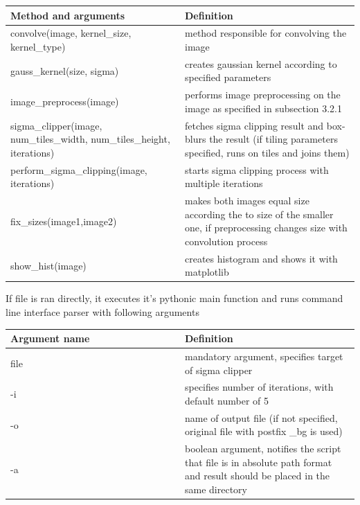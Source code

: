 \documentclass[12pt, a4paper, oneside]{book}
\begin{document}
\begin{center}
    \begin{tabular}  { | p{0.5\linewidth} | p{0.5\linewidth} | }
        \hline
        Method and arguments & Definition \\
        \hline
        convolve(image, kernel\_size, kernel\_type) & method responsible for convolving the image\\
        \hline
        gauss\_kernel(size, sigma) & creates gaussian kernel according to specified parameters \\
        \hline
        image\_preprocess(image) & performs image preprocessing on the image as specified in subsection 3.2.1 \\
        \hline
        sigma\_clipper(image, num\_tiles\_width, num\_tiles\_height, iterations) & fetches sigma clipping result and box-blurs the result (if tiling parameters specified, runs on tiles and joins them) \\
        \hline
        perform\_sigma\_clipping(image, iterations) & starts sigma clipping process with multiple iterations \\
        \hline
        fix\_sizes(image1,image2) & makes both images equal size according the to size of the smaller one, if preprocessing changes size with convolution process \\
        \hline
        show\_hist(image) & creates histogram and shows it with matplotlib \\
        \hline
    \end{tabular}
\end{center}

If file is ran directly, it executes it's pythonic main function and runs command line interface parser with following arguments

\begin{center}
    \begin{tabular}  { | p{0.5\linewidth} | p{0.5\linewidth} | }
        \hline
        Argument name & Definition \\
        \hline
        file & mandatory argument, specifies target of sigma clipper \\
        \hline
        -i & specifies number of iterations, with default number of 5 \\
        \hline
        -o & name of output file (if not specified, original file with postfix \_bg is used)\\
        \hline
        -a & boolean argument, notifies the script that file is in absolute path format and result should be placed in the same directory \\
        \hline
    \end{tabular}
\end{center}
\end{document}

